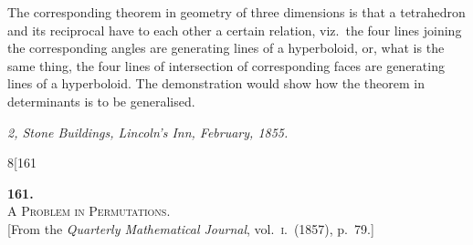 \documentclass[11pt]{article}
\begin{document}
The corresponding theorem in geometry of three dimensions is that a tetrahedron
and its reciprocal have to each other a certain relation, viz.\ the four lines joining the
corresponding angles are generating lines of a hyperboloid, or, what is the same thing,
the four lines of intersection of corresponding faces are generating lines of a hyperboloid.
The demonstration would show how the theorem in determinants is to be generalised.

\bigskip

\noindent\textit{2, Stone Buildings, Lincoln's Inn, February, 1855.}

\newpage

\begin{center}
\small\textsc{8}\hfill\hfill[161
\end{center}

\vspace{4em}

\begin{center}
{\large\textbf{161.}}\\[1em]
{\large\scshape A Problem in Permutations.}\\[1em]
{\small [From the \textit{Quarterly Mathematical Journal}, vol.~\textsc{i}.\ (1857), p.~79.]}
\end{center}

\bigskip
\end{document}
